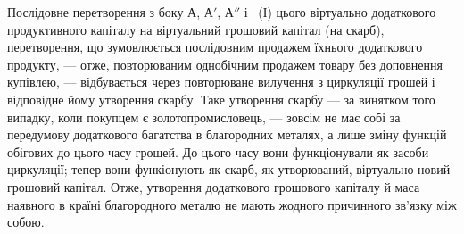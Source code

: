 Послідовне перетворення з боку $А$, $А'$, $А''$ і~ (І) цього віртуально
додаткового продуктивного капіталу на віртуальний грошовий
капітал (на скарб), перетворення, що зумовлюється послідовним продажем
їхнього додаткового продукту, — отже, повторюваним однобічним продажем
товару без доповнення купівлею, — відбувається через повторюване
вилучення з циркуляції грошей і відповідне йому утворення скарбу. Таке
утворення скарбу — за винятком того випадку, коли покупцем є золотопромисловець,
— зовсім не має собі за передумову додаткового багатства
в благородних металях, а лише зміну функцій обігових до цього часу
грошей. До цього часу вони функціонували як засоби циркуляції; тепер
вони функіонують як скарб, як утворюваний, віртуально новий грошовий
капітал. Отже, утворення додаткового грошового капіталу й маса
наявного в країні благородного металю не мають жодного причинного
зв'язку між собою.
